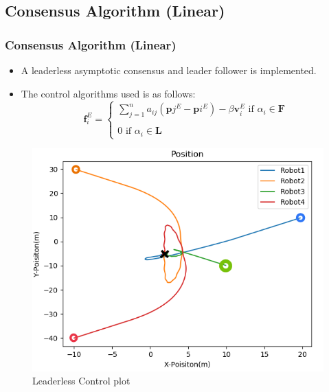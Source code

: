 \documentclass[10pt]{beamer}
\begin{document}
\subsection*{Consensus Algorithm (Linear)}
\begin{frame}
	\frametitle{Consensus Algorithm (Linear)}
	\begin{itemize}
		\item A leaderless asymptotic consensus and leader follower is implemented.
		\item The control algorithms used is as follows:
		      \begin{equation*}
			      \textbf{f}_{i}^{E}=\left\{\begin{array}{l}
				      \sum_{j = 1}^{n} a_{ij}\left(\mathbf{p}{j}^{E}-\mathbf{p}{i}^{E}\right)-\beta \textbf{v}_{i}^{E} \text { if } \alpha_{i} \in \mathbf{F} \\
				      \\
				      0 \text { if }  \alpha_{i} \in \mathbf{L}
			      \end{array}\right.
		      \end{equation*}
	\end{itemize}
	\begin{minipage}{0.47\textwidth}
		\begin{figure}[h!]
			\centering
			\includegraphics[scale=0.27]{Position.png}
			\caption{Leaderless Control plot}
			\label{Fig:pos_x_c}
		\end{figure}
	\end{minipage}
	\begin{minipage}{0.47\textwidth}
		\begin{figure}[h!]

\end{figure}
\end{minipage}
\end{frame}
\end{document}
